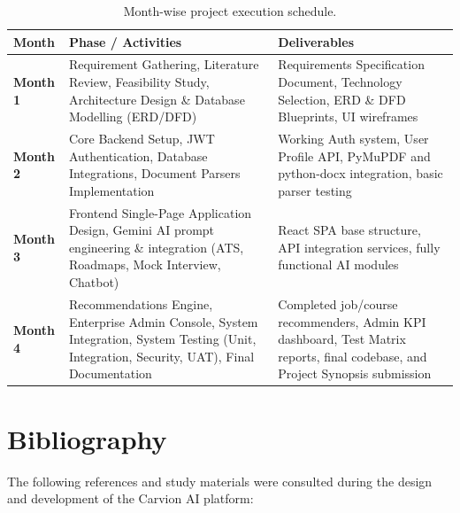 \documentclass[12pt,a4paper]{article}
\begin{document}
\begin{table}[htbp]
\centering
\caption{Month-wise project execution schedule.}
\label{tab:plan_of_work}
\begin{tabular}{p{2.5cm}p{6cm}p{5.5cm}}
\toprule
\textbf{Month} & \textbf{Phase / Activities} & \textbf{Deliverables} \\
\midrule
\textbf{Month 1} & Requirement Gathering, Literature Review, Feasibility Study, Architecture Design \& Database Modelling (ERD/DFD) & Requirements Specification Document, Technology Selection, ERD \& DFD Blueprints, UI wireframes \\
\textbf{Month 2} & Core Backend Setup, JWT Authentication, Database Integrations, Document Parsers Implementation & Working Auth system, User Profile API, PyMuPDF and python-docx integration, basic parser testing \\
\textbf{Month 3} & Frontend Single-Page Application Design, Gemini AI prompt engineering \& integration (ATS, Roadmaps, Mock Interview, Chatbot) & React SPA base structure, API integration services, fully functional AI modules \\
\textbf{Month 4} & Recommendations Engine, Enterprise Admin Console, System Integration, System Testing (Unit, Integration, Security, UAT), Final Documentation & Completed job/course recommenders, Admin KPI dashboard, Test Matrix reports, final codebase, and Project Synopsis submission \\
\bottomrule
\end{tabular}
\end{table}


\clearpage

\section{Bibliography}

The following references and study materials were consulted during the design and development of the Carvion AI platform:
\end{document}
